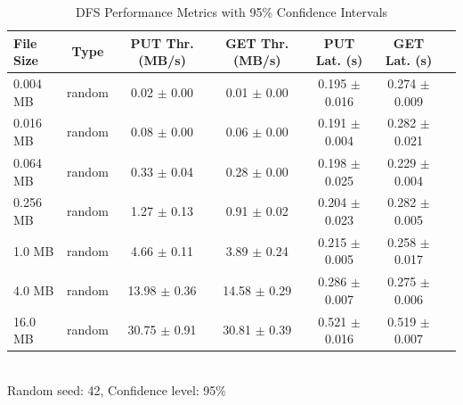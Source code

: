\begin{table}[t]
\centering
\caption{DFS Performance Metrics with 95\% Confidence Intervals}
\label{tab:performance}
\begin{tabular}{lcccccc}
\toprule
File Size & Type & PUT Thr. (MB/s) & GET Thr. (MB/s) & PUT Lat. (s) & GET Lat. (s) \\
\midrule
0.004 MB & random & 0.02 $\pm$ 0.00 & 0.01 $\pm$ 0.00 & 0.195 $\pm$ 0.016 & 0.274 $\pm$ 0.009 \\
0.016 MB & random & 0.08 $\pm$ 0.00 & 0.06 $\pm$ 0.00 & 0.191 $\pm$ 0.004 & 0.282 $\pm$ 0.021 \\
0.064 MB & random & 0.33 $\pm$ 0.04 & 0.28 $\pm$ 0.00 & 0.198 $\pm$ 0.025 & 0.229 $\pm$ 0.004 \\
0.256 MB & random & 1.27 $\pm$ 0.13 & 0.91 $\pm$ 0.02 & 0.204 $\pm$ 0.023 & 0.282 $\pm$ 0.005 \\
1.0 MB & random & 4.66 $\pm$ 0.11 & 3.89 $\pm$ 0.24 & 0.215 $\pm$ 0.005 & 0.258 $\pm$ 0.017 \\
4.0 MB & random & 13.98 $\pm$ 0.36 & 14.58 $\pm$ 0.29 & 0.286 $\pm$ 0.007 & 0.275 $\pm$ 0.006 \\
16.0 MB & random & 30.75 $\pm$ 0.91 & 30.81 $\pm$ 0.39 & 0.521 $\pm$ 0.016 & 0.519 $\pm$ 0.007 \\
\bottomrule
\end{tabular}
\\\small{Random seed: 42, Confidence level: 95\%}
\end{table}